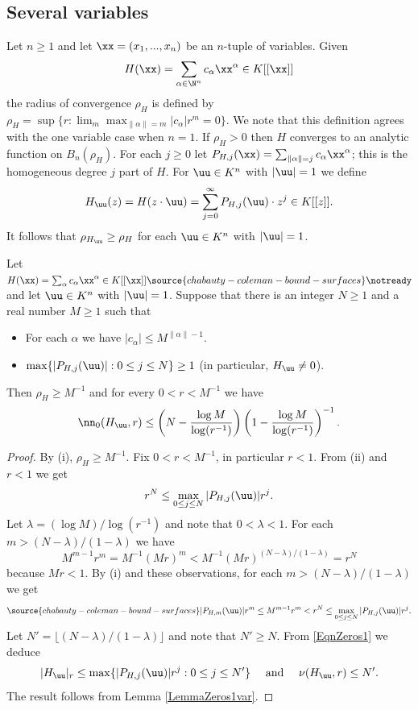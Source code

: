 \subsection{Several variables} Let $n\ge 1$ and let $\xx=(x_1,...,x_n)$ be an $n$-tuple of variables. Given
$$
H(\xx)=\sum_{\alpha\in \N^n} c_\alpha \xx^\alpha\in K[[\xx ]]
$$
the radius of convergence $\rho_H$ is defined by $\rho_H= \sup \{r : \lim_m \max_{\|\alpha\| = m} |c_\alpha|r^m=0\}$. We note that this definition agrees with the one variable case when $n=1$. If $\rho_H>0$ then $H$ converges to an analytic function on $B_n(\rho_H)$. For each $j\ge 0$ let $P_{H,j}(\xx)=\sum_{\|\alpha\|=j} c_\alpha \xx^\alpha$; this is the homogeneous degree $j$ part of $H$. For $\uu\in K^n$ with $|\uu|=1$ we define
$$
H_\uu(z)=H(z\cdot \uu)=\sum_{j=0}^\infty P_{H,j}(\uu) \cdot z^j\in K[[z]].
$$
It follows that $\rho_{H_\uu}\ge \rho_H$ for each $\uu\in K^n$ with $|\uu|=1$.
\begin{lemma}\label{LemmaMVzeros} Let $H(\xx)=\sum_\alpha c_\alpha \xx^\alpha\in K[[\xx]]
\source{chabauty-coleman-bound-surfaces}
\notready$ and let $\uu\in K^n$ with $|\uu|=1$. Suppose that there is an integer  $N\ge 1$ and a real number $M\ge 1$ such that
\begin{itemize}
\item[(i)] For each $\alpha$ we have $|c_\alpha|\le M^{\|\alpha\|-1}$.
\item[(ii)] $\max\{|P_{H,j}(\uu)| : 0\le j\le N\}\ge 1$ (in particular, $H_\uu\ne 0$).
\end{itemize}
Then $\rho_H\ge M^{-1}$ and for every $0<r<M^{-1}$ we have
$$
\nn_0(H_\uu,r)\le \left(N-\frac{\log M}{\log (r^{-1})}\right)\left(1-\frac{\log M}{\log (r^{-1})}\right)^{-1}.
$$
\end{lemma}
\begin{proof}
By (i), $\rho_H\ge M^{-1}$. Fix $0<r<M^{-1}$, in particular $r<1$. From (ii) and $r<1$ we get
$$
r^N\le \max_{0\le j\le N} |P_{H,j}(\uu)|r^j.
$$
Let $\lambda = (\log M)/\log(r^{-1})$ and note that $0<\lambda<1$. For each $m> (N-\lambda)/(1-\lambda)$ we have
$$
M^{m-1}r^m=M^{-1}(Mr)^m<M^{-1}(Mr)^{(N-\lambda)/(1-\lambda)}=r^N
$$
because $Mr<1$. By (i) and these observations, for each $m> (N-\lambda)/(1-\lambda)$ we get
\begin{equation}\label{EqnZeros1}
\source{chabauty-coleman-bound-surfaces}
|P_{H,m}(\uu) |r^m \le M^{m-1} r^m  < r^N \le \max_{0\le j\le N} |P_{H,j}(\uu )|r^j.
\end{equation}
Let $N'=\lfloor (N-\lambda)/(1-\lambda)\rfloor$ and note that $N'\ge N$.  From \eqref{EqnZeros1} we deduce
$$
|H_{\uu}|_r\le \max\{|P_{H,j}(\uu )|r^j : 0\le j\le N'\}\quad \mbox{ and }\quad \nu(H_\uu, r)\le N'.
$$
The result follows from Lemma \ref{LemmaZeros1var}.
\end{proof}
